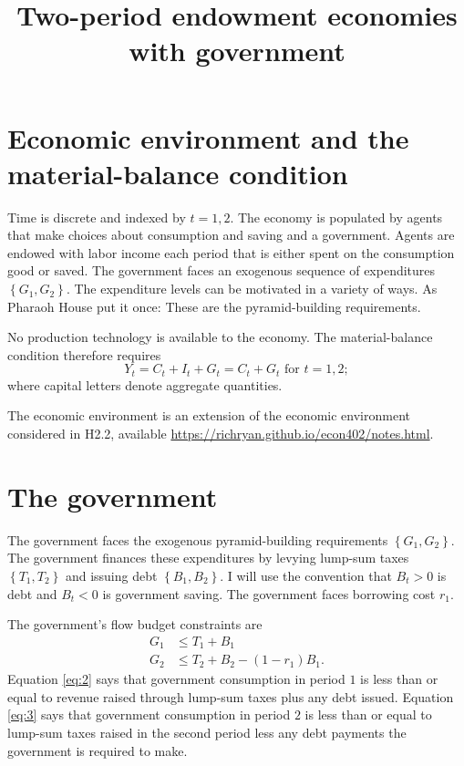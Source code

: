 \documentclass[12pt]{pracjourn_rwr}
\title{Two-period endowment economies with government}
\theoremstyle{remark}
\begin{document}
\maketitle

\tableofcontents

\section{Economic environment and the material-balance condition}

Time is discrete and indexed by $t=1,2$.
The economy is populated by agents that make choices about consumption and saving and a government.
Agents are endowed with labor income each period that is either spent on the consumption good or saved.
The government faces an exogenous sequence of expenditures $\left\{ G_{1},G_{2} \right\}$.
The expenditure levels can be motivated in a variety of ways.
As Pharaoh House put it once: These are the pyramid-building requirements.

No production technology is available to the economy.
The material-balance condition therefore requires
\begin{equation}
\label{eq:1}
Y_{t} = C_{t} + I_{t} + G_{t} = C_{t} + G_{t} \text{ for } t=1,2;
\end{equation}
where capital letters denote aggregate quantities.

The economic environment is an extension of the economic environment considered in H2.2,
available \url{https://richryan.github.io/econ402/notes.html}.

\section{The government}

The government faces the exogenous pyramid-building requirements $\left\{ G_{1},G_{2} \right\}$.
The government finances these expenditures by levying lump-sum taxes $\left\{ T_{1},T_{2} \right\}$ and
issuing debt $\left\{ B_{1},B_{2} \right\}$.
I will use the convention that $B_{t} > 0$ is debt and $B_{t} < 0$ is government saving.
The government faces borrowing cost $r_{1}$.

The government's flow budget constraints are
\begin{align}
\label{eq:2}
G_{1} &\leq T_{1} + B_{1} \\
\label{eq:3}
G_{2} &\leq T_{2} + B_{2} - (1-r_{1})B_{1}.
\end{align}
Equation \eqref{eq:2} says that government consumption in period $1$ is less than or equal to revenue raised through lump-sum taxes plus any debt issued.
Equation \eqref{eq:3} says that government consumption in period $2$ is less than or equal to lump-sum taxes raised in the second period less any debt payments the government is required to make.
\end{document}
